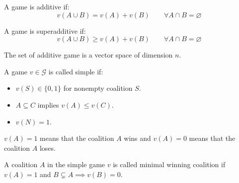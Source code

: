 \begin{definition}
    A game is additive if: 
    \[v(A\cup B)=v(A)+v(B)\qquad\forall A\cap B=\varnothing\]
\end{definition}
\begin{definition}
    A game is superadditive if: 
    \[v(A\cup B)\geq v(A)+v(B)\qquad\forall A\cap B=\varnothing\]
\end{definition}
\noindent The set of additive game is a vector space of dimension $n$. 

\begin{definition}
    A game $v\in\mathcal{G}$ is called simple if: 
    \begin{itemize}
        \item $v(S)\in\{0,1\}$ for nonempty coalition $S$. 
        \item $A\subseteq C$ implies $v(A)\leq v(C)$. 
        \item $v(N)=1$.
    \end{itemize}
\end{definition}
\noindent $v(A)=1$ means that the coalition $A$ wins and $v(A)=0$ means that the coalition $A$ loses. 
\begin{definition}
    A coalition $A$ in the simple game $v$ is called minimal winning coalition if $v(A)=1$ and $B\subsetneq A\implies v(B)=0$. 
\end{definition}